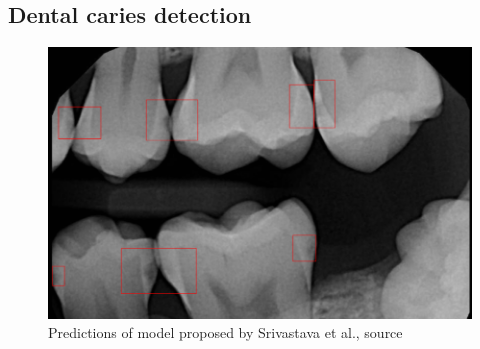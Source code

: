 \subsection{Dental caries detection}
\begin{figure}
    \centering
    \includegraphics[width=\linewidth]{images/sirvastava_pred.png}
    \caption{Predictions of model proposed by Srivastava et al., source \cite{Srivastava2017}}
    \label{fig:srivastava_preds}
\end{figure}
